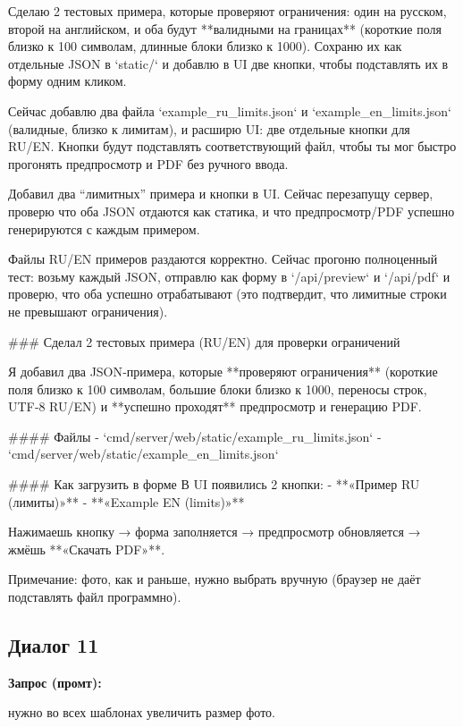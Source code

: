 \documentclass[a4paper, 14pt]{extarticle} %
\begin{document}
\begin{AnswerBlock}

Сделаю 2 тестовых примера, которые проверяют ограничения: один на русском, второй на английском, и оба будут **валидными на границах** (короткие поля близко к 100 символам, длинные блоки близко к 1000). Сохраню их как отдельные JSON в `static/` и добавлю в UI две кнопки, чтобы подставлять их в форму одним кликом.

Сейчас добавлю два файла `example_ru_limits.json` и `example_en_limits.json` (валидные, близко к лимитам), и расширю UI: две отдельные кнопки для RU/EN. Кнопки будут подставлять соответствующий файл, чтобы ты мог быстро прогонять предпросмотр и PDF без ручного ввода.

Добавил два “лимитных” примера и кнопки в UI. Сейчас перезапущу сервер, проверю что оба JSON отдаются как статика, и что предпросмотр/PDF успешно генерируются с каждым примером.

Файлы RU/EN примеров раздаются корректно. Сейчас прогоню полноценный тест: возьму каждый JSON, отправлю как форму в `/api/preview` и `/api/pdf` и проверю, что оба успешно отрабатывают (это подтвердит, что лимитные строки не превышают ограничения).

### Сделал 2 тестовых примера (RU/EN) для проверки ограничений

Я добавил два JSON‑примера, которые **проверяют ограничения** (короткие поля близко к 100 символам, большие блоки близко к 1000, переносы строк, UTF‑8 RU/EN) и **успешно проходят** предпросмотр и генерацию PDF.

#### Файлы
- `cmd/server/web/static/example_ru_limits.json`
- `cmd/server/web/static/example_en_limits.json`

#### Как загрузить в форме
В UI появились 2 кнопки:
- **«Пример RU (лимиты)»**
- **«Example EN (limits)»**

Нажимаешь кнопку → форма заполняется → предпросмотр обновляется → жмёшь **«Скачать PDF»**.

Примечание: фото, как и раньше, нужно выбрать вручную (браузер не даёт подставлять файл программно).

\end{AnswerBlock}

\subsection*{Диалог 11}

\textbf{Запрос (промт):}

\begin{PromptBlock}

нужно во всех шаблонах увеличить размер фото.

\end{PromptBlock}
\end{document}
